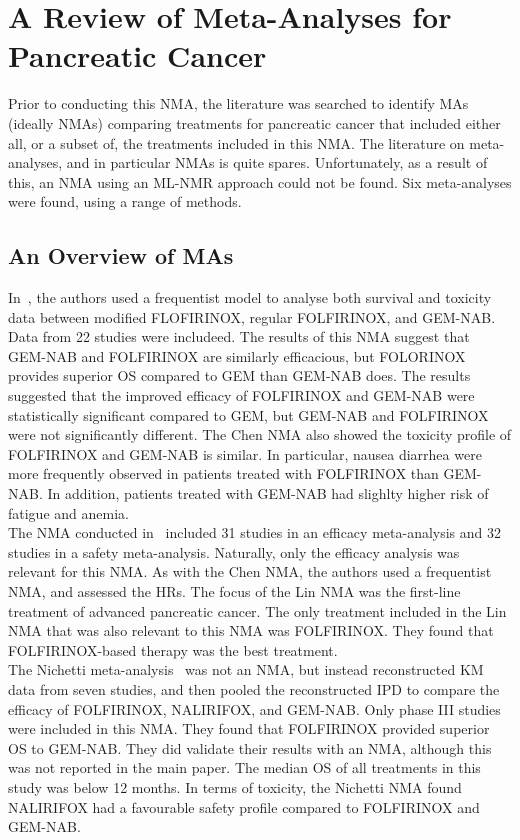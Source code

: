 \chapter{A Review of Meta-Analyses for Pancreatic Cancer}\label{litChap}
Prior to conducting this NMA, the literature was searched to identify MAs (ideally NMAs) comparing treatments for pancreatic cancer that included either all, or a subset of, the treatments included in this NMA. The literature on meta-analyses, and in particular NMAs is quite spares. Unfortunately, as a result of this, an NMA using an ML-NMR approach could not be found. Six meta-analyses were found, using a range of methods.

\section{An Overview of MAs}
In~\cite{chen}, the authors used a frequentist model to analyse both survival and toxicity data between modified FLOFIRINOX, regular FOLFIRINOX, and GEM-NAB. Data from 22 studies were includeed. The results of this NMA suggest that GEM-NAB and FOLFIRINOX are similarly efficacious, but FOLORINOX provides superior OS compared to GEM than GEM-NAB does. The results suggested that the improved efficacy of FOLFIRINOX and GEM-NAB were statistically significant compared to GEM, but GEM-NAB and FOLFIRINOX were not significantly different. The Chen NMA also showed the toxicity profile of FOLFIRINOX and GEM-NAB is similar. In particular, nausea diarrhea were more frequently observed in patients treated with FOLFIRINOX than GEM-NAB. In addition, patients treated with GEM-NAB had slighlty higher risk of fatigue and anemia. \\

The NMA conducted in~\cite{lin} included 31 studies in an efficacy meta-analysis and 32 studies in a safety meta-analysis. Naturally, only the efficacy analysis was relevant for this NMA. As with the Chen NMA, the authors used a frequentist NMA, and assessed the HRs. The focus of the Lin NMA was the first-line treatment of advanced pancreatic cancer. The only treatment included in the Lin NMA that was also relevant to this NMA was FOLFIRINOX. They found that FOLFIRINOX-based therapy was the best treatment. \\

The Nichetti meta-analysis~\cite{nichetti} was not an NMA, but instead reconstructed KM data from seven studies, and then pooled the reconstructed IPD to compare the efficacy of FOLFIRINOX, NALIRIFOX, and GEM-NAB. Only phase III studies were included in this NMA. They found that FOLFIRINOX provided superior OS to GEM-NAB. They did validate their results with an NMA, although this was not reported in the main paper. The median OS of all treatments in this study was below 12 months. In terms of toxicity, the Nichetti NMA found NALIRIFOX had a favourable safety profile compared to FOLFIRINOX and GEM-NAB. \\

